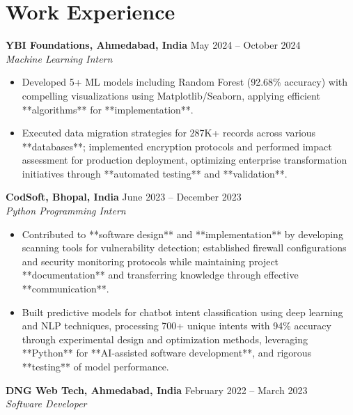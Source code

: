 \documentclass[a4paper,10pt]{article}
\begin{document}
\section*{Work Experience}
\textbf{YBI Foundations, Ahmedabad, India} \hfill May 2024 -- October 2024\\
\textit{Machine Learning Intern} \\
\begin{itemize}[leftmargin=*, itemsep=0pt, parsep=1pt]
\vspace{-6mm}
\item Developed 5+ ML models including Random Forest (92.68\% accuracy) with compelling visualizations using Matplotlib/Seaborn, applying efficient **algorithms** for **implementation**.
\item Executed data migration strategies for 287K+ records across various **databases**; implemented encryption protocols and performed impact assessment for production deployment, optimizing enterprise transformation initiatives through **automated testing** and **validation**.
\end{itemize}
\textbf{CodSoft, Bhopal, India} \hfill June 2023 -- December 2023\\
\textit{Python Programming Intern} \\
\begin{itemize}[leftmargin=*, itemsep=0pt, parsep=1pt]
\vspace{-6mm}
\item Contributed to **software design** and **implementation** by developing scanning tools for vulnerability detection; established firewall configurations and security monitoring protocols while maintaining project **documentation** and transferring knowledge through effective **communication**.
\item Built predictive models for chatbot intent classification using deep learning and NLP techniques, processing 700+ unique intents with 94\% accuracy through experimental design and optimization methods, leveraging **Python** for **AI-assisted software development**, and rigorous **testing** of model performance.
\vspace{-1mm}
\end{itemize}

\textbf{DNG Web Tech, Ahmedabad, India} \hfill February 2022 -- March 2023 \\
\textit{Software Developer} \\
\end{document}
